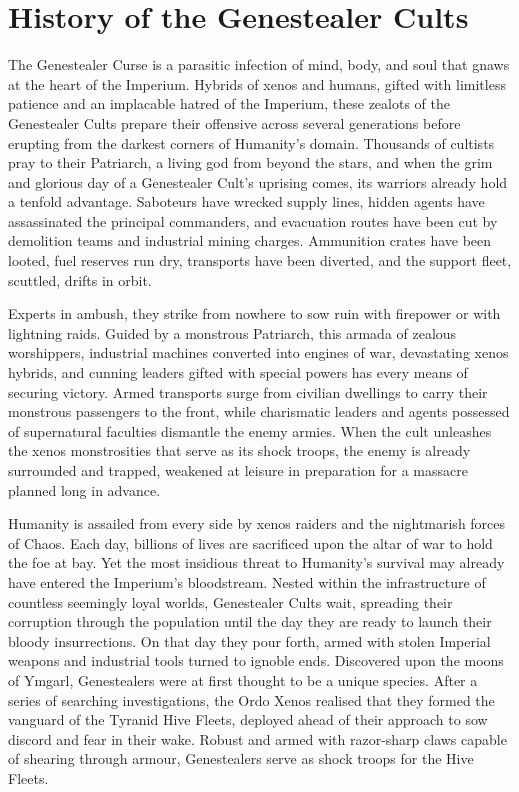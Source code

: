 \section{History of the Genestealer Cults}

The Genestealer Curse is a parasitic infection of mind, body, and soul that gnaws at the heart of the Imperium. Hybrids of xenos and humans, gifted with limitless patience and an implacable hatred of the Imperium, these zealots of the Genestealer Cults prepare their offensive across several generations before erupting from the darkest corners of Humanity's domain. Thousands of cultists pray to their Patriarch, a living god from beyond the stars, and when the grim and glorious day of a Genestealer Cult's uprising comes, its warriors already hold a tenfold advantage. Saboteurs have wrecked supply lines, hidden agents have assassinated the principal commanders, and evacuation routes have been cut by demolition teams and industrial mining charges. Ammunition crates have been looted, fuel reserves run dry, transports have been diverted, and the support fleet, scuttled, drifts in orbit.

Experts in ambush, they strike from nowhere to sow ruin with firepower or with lightning raids. Guided by a monstrous Patriarch, this armada of zealous worshippers, industrial machines converted into engines of war, devastating xenos hybrids, and cunning leaders gifted with special powers has every means of securing victory. Armed transports surge from civilian dwellings to carry their monstrous passengers to the front, while charismatic leaders and agents possessed of supernatural faculties dismantle the enemy armies. When the cult unleashes the xenos monstrosities that serve as its shock troops, the enemy is already surrounded and trapped, weakened at leisure in preparation for a massacre planned long in advance.

Humanity is assailed from every side by xenos raiders and the nightmarish forces of Chaos. Each day, billions of lives are sacrificed upon the altar of war to hold the foe at bay. Yet the most insidious threat to Humanity's survival may already have entered the Imperium's bloodstream. Nested within the infrastructure of countless seemingly loyal worlds, Genestealer Cults wait, spreading their corruption through the population until the day they are ready to launch their bloody insurrections. On that day they pour forth, armed with stolen Imperial weapons and industrial tools turned to ignoble ends. Discovered upon the moons of Ymgarl, Genestealers were at first thought to be a unique species. After a series of searching investigations, the Ordo Xenos realised that they formed the vanguard of the Tyranid Hive Fleets, deployed ahead of their approach to sow discord and fear in their wake. Robust and armed with razor-sharp claws capable of shearing through armour, Genestealers serve as shock troops for the Hive Fleets.

